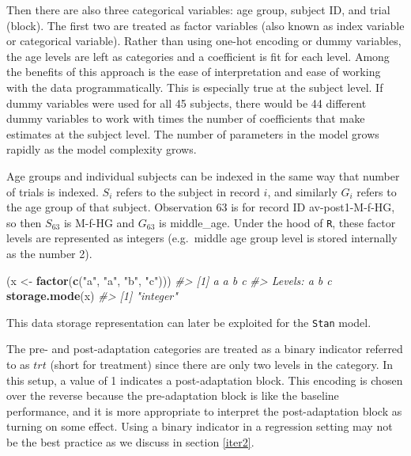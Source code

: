 \documentclass[11pt, oneside, openany]{scrbook}
\newenvironment{Shaded}{\begin{snugshade}}{\end{snugshade}}
\newcommand{\CommentTok}[1]{\textcolor[rgb]{0.56,0.35,0.01}{\textit{#1}}}
\newcommand{\KeywordTok}[1]{\textcolor[rgb]{0.13,0.29,0.53}{\textbf{#1}}}
\newcommand{\NormalTok}[1]{#1}
\newcommand{\StringTok}[1]{\textcolor[rgb]{0.31,0.60,0.02}{#1}}
\begin{document}
Then there are also three categorical variables: age group, subject ID, and trial (block). The first two are treated as factor variables (also known as index variable or categorical variable). Rather than using one-hot encoding or dummy variables, the age levels are left as categories and a coefficient is fit for each level. Among the benefits of this approach is the ease of interpretation and ease of working with the data programmatically. This is especially true at the subject level. If dummy variables were used for all 45 subjects, there would be 44 different dummy variables to work with times the number of coefficients that make estimates at the subject level. The number of parameters in the model grows rapidly as the model complexity grows.

Age groups and individual subjects can be indexed in the same way that number of trials is indexed. \(S_i\) refers to the subject in record \(i\), and similarly \(G_i\) refers to the age group of that subject. Observation 63 is for record ID av-post1-M-f-HG, so then \(S_{63}\) is M-f-HG and \(G_{63}\) is middle\_age. Under the hood of \texttt{R}, these factor levels are represented as integers (e.g.~middle age group level is stored internally as the number 2).

\begin{Shaded}
\begin{Highlighting}[]
\NormalTok{(x <-}\StringTok{ }\KeywordTok{factor}\NormalTok{(}\KeywordTok{c}\NormalTok{(}\StringTok{"a"}\NormalTok{, }\StringTok{"a"}\NormalTok{, }\StringTok{"b"}\NormalTok{, }\StringTok{"c"}\NormalTok{)))}
\CommentTok{#> [1] a a b c}
\CommentTok{#> Levels: a b c}
\KeywordTok{storage.mode}\NormalTok{(x)}
\CommentTok{#> [1] "integer"}
\end{Highlighting}
\end{Shaded}

This data storage representation can later be exploited for the \texttt{Stan} model.

The pre- and post-adaptation categories are treated as a binary indicator referred to as \(trt\) (short for treatment) since there are only two levels in the category. In this setup, a value of 1 indicates a post-adaptation block. This encoding is chosen over the reverse because the pre-adaptation block is like the baseline performance, and it is more appropriate to interpret the post-adaptation block as turning on some effect. Using a binary indicator in a regression setting may not be the best practice as we discuss in section \ref{iter2}.
\end{document}
